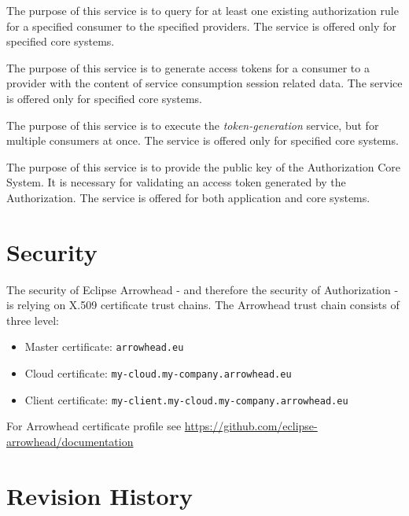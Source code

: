 \documentclass[a4paper]{arrowhead}
\begin{document}
The purpose of this service is to query for at least one existing authorization rule for a specified consumer to the specified providers. The service is offered only for specified core systems.

The purpose of this service is to generate access tokens for a consumer to a provider with the content of service consumption session related data. The service is offered only for specified core systems.

The purpose of this service is to execute the \textit{token-generation} service, but for multiple consumers at once. The service is offered only for specified core systems.

The purpose of this service is to provide the public key of the Authorization Core System. It is necessary for validating an access token generated by the Authorization. The service is offered for both application and core systems. 

\newpage

\section{Security}
\label{sec:security}

The security of Eclipse Arrowhead - and therefore the security of Authorization  - is relying on X.509 certificate trust chains. The Arrowhead trust chain consists of three level:
\begin{itemize}
    \item Master certificate: \texttt{arrowhead.eu}
    \item Cloud certificate: \texttt {my-cloud.my-company.arrowhead.eu}
    \item Client certificate: \texttt{my-client.my-cloud.my-company.arrowhead.eu}
\end{itemize}

For Arrowhead certificate profile see \url{https://github.com/eclipse-arrowhead/documentation}

\newpage




\newpage

\section{Revision History}
\end{document}

